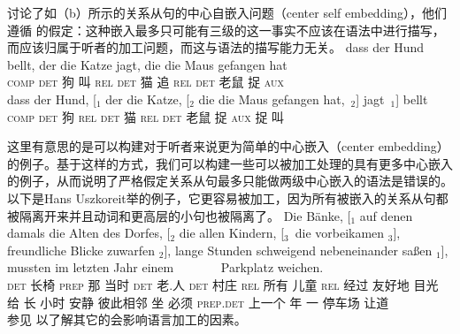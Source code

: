  \citet*{JBR2000a}讨论了如（b）所示的关系从句的中心自嵌入问题（center self embedding），他们遵循 \citet[]{CM63a}的假定：这种嵌入最多只可能有三级的这一事实不应该在语法中进行描写，而应该归属于听者的加工问题，而这与语法的描写能力无关。
\eal
\label{TAG-Beispiel-Performanz}
\ex 
\gll dass der Hund bellt, der  die Katze jagt,  die  die Maus  gefangen hat\\
     \textsc{comp} \textsc{det} 狗  叫  \textsc{rel} \textsc{det} 猫 追 \textsc{rel} \textsc{det} 老鼠 捉 \textsc{aux}   \\
\ex 
\gll dass der Hund, [$_1$ der  die Katze, [$_2$ die  die Maus  gefangen hat,~$_2$] jagt~$_1$] bellt\\
     \textsc{comp} \textsc{det} 狗  {}  \textsc{rel} \textsc{det} 猫 {} \textsc{rel} \textsc{det} 老鼠 捉 \textsc{aux}   捉 叫 \\
\zl

\noindent
这里有意思的是可以构建对于听者来说更为简单的中心嵌入（center embedding）的例子。基于这样的方式，我们可以构建一些可以被加工处理的具有更多中心嵌入的例子，从而说明了严格假定关系从句最多只能做两级中心嵌入的语法是错误的。以下是Hans Uszkoreit举的例子，它更容易被加工，因为所有被嵌入的关系从句都被隔离开来并且动词和更高层的小句也被隔离了。
\ea
\gll Die Bänke, [$_1$ auf denen damals die Alten des Dorfes, [$_2$ die allen Kindern, [$_3$~die vorbeikamen $_3$], freundliche Blicke zuwarfen $_2$], 
lange Stunden schweigend nebeneinander saßen $_1$], mussten im letzten Jahr einem~~~~~~~ Parkplatz weichen.\\
\textsc{det} 长椅 {} \textsc{prep} 那 当时 \textsc{det} 老.人 \textsc{det} 村庄 {} \textsc{rel} 所有 儿童 \hspaceThis{[$_3$~}\textsc{rel} 经过 {} 友好地 目光 给 {}
长 小时 安静 彼此相邻 坐 {} 必须 \textsc{prep}.\textsc{det} 上一个 年 一 停车场 让道\\
\z
参见 以了解其它的会影响语言加工的因素。

